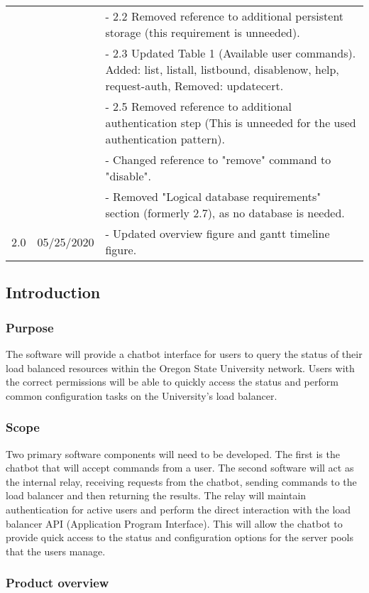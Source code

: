 \begin{longtable}{ | p{1in} p{1in} p{4in} | }
 & & - 2.2 Removed reference to additional persistent storage (this requirement is unneeded).\\
 & & - 2.3 Updated Table 1 (Available user commands). Added: list, listall, listbound, disablenow, help, request-auth, Removed: updatecert.\\
 & & - 2.5 Removed reference to additional authentication step (This is unneeded for the used authentication pattern).\\
 & & - Changed reference to "remove" command to "disable".\\
 & & - Removed "Logical database requirements" section (formerly 2.7), as no database is needed.\\
 \hline
 2.0 & 05/25/2020
   & - Updated overview figure and gantt timeline figure.\\
 \hline
\end{longtable}

\subsection{Introduction}
\subsubsection{Purpose}
 The software will provide a chatbot interface for users to query the status of their load balanced resources within the Oregon State University network.
 Users with the correct permissions will be able to quickly access the status and perform common configuration tasks on the University's load balancer.
 
\subsubsection{Scope}
Two primary software components will need to be developed.
The first is the chatbot that will accept commands from a user.
The second software will act as the internal relay, receiving requests from the chatbot, sending commands to the load balancer and then returning the results.
The relay will maintain authentication for active users and perform the direct interaction with the load balancer API (Application Program Interface).
This will allow the chatbot to provide quick access to the status and configuration options for the server pools that the users manage.

\subsubsection{Product overview}

